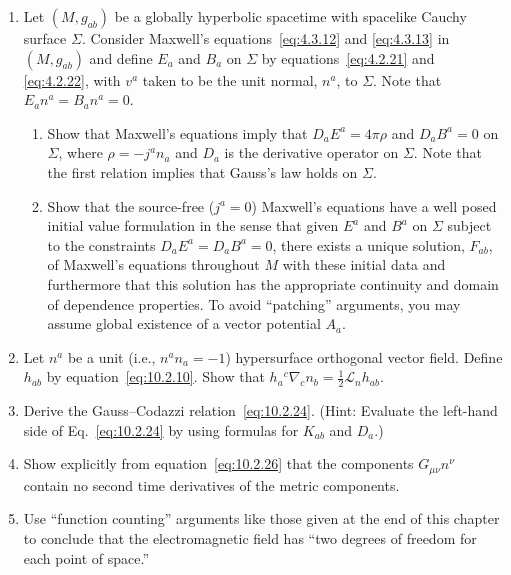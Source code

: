 \begin{enumerate}[label=\arabic*.,leftmargin=*,itemsep=1em]
\item Let \((M,g_{ab})\) be a globally hyperbolic spacetime with spacelike Cauchy
surface \(\Sigma\). Consider Maxwell's equations~\eqref{eq:4.3.12} and
\eqref{eq:4.3.13} in \((M,g_{ab})\) and define \(E_a\) and \(B_a\) on \(\Sigma\) by
equations~\eqref{eq:4.2.21} and \eqref{eq:4.2.22}, with \(v^a\) taken to be the unit
normal, \(n^a\), to \(\Sigma\). Note that \(E_an^a=B_an^a=0\).
  \begin{enumerate}[label=\alph*),leftmargin=2.2em,itemsep=.45em]
  \item Show that Maxwell's equations imply that \(D_aE^a=4\pi\rho\) and
  \(D_aB^a=0\) on \(\Sigma\), where \(\rho=-j^an_a\) and \(D_a\) is the derivative
  operator on \(\Sigma\). Note that the first relation implies that Gauss's law holds
  on \(\Sigma\).

  \item Show that the source-free (\(j^a=0\)) Maxwell's equations have a well posed
  initial value formulation in the sense that given \(E^a\) and \(B^a\) on \(\Sigma\)
  subject to the constraints \(D_aE^a=D_aB^a=0\), there exists a unique solution,
  \(F_{ab}\), of Maxwell's equations throughout \(M\) with these initial data and
  furthermore that this solution has the appropriate continuity and domain of
  dependence properties. To avoid ``patching'' arguments, you may assume global
  existence of a vector potential \(A_a\).
  \end{enumerate}

\item Let \(n^a\) be a unit (i.e., \(n^an_a=-1\)) hypersurface orthogonal vector
field. Define \(h_{ab}\) by equation~\eqref{eq:10.2.10}. Show that
\(h_a{}^c\nabla_cn_b=\frac12\mathcal L_nh_{ab}\).

\item Derive the Gauss--Codazzi relation~\eqref{eq:10.2.24}. (Hint: Evaluate the
left-hand side of Eq.~\eqref{eq:10.2.24} by using formulas for \(K_{ab}\) and
\(D_a\).)

\item Show explicitly from equation~\eqref{eq:10.2.26} that the components
\(G_{\mu\nu}n^\nu\) contain no second time derivatives of the metric components.

\item Use ``function counting'' arguments like those given at the end of this chapter
to conclude that the electromagnetic field has ``two degrees of freedom for each
point of space.''
\end{enumerate}

\endgroup
